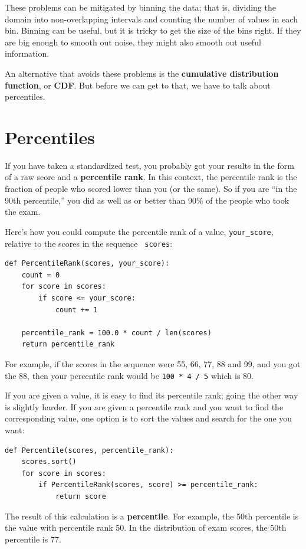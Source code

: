 \documentclass[12pt]{book}
\begin{document}
These problems can be mitigated by binning the data;
that is, dividing the domain into non-overlapping intervals and counting
the number of values in each bin.  Binning can be useful, but it is
tricky to get the size of the bins right.  If they are big enough to
smooth out noise, they might also smooth out useful information.

An alternative that avoids these problems is the {\bf cumulative
distribution function}, or {\bf CDF}.  But before we can get to that,
we have to talk about percentiles.


\section{Percentiles}

If you have taken a standardized test, you probably got your
results in the form of a raw score and a {\bf percentile rank}.
In this context, the percentile rank is the fraction of people who
scored lower than you (or the same).  So if you are ``in the 90th
percentile,'' you did as well as or better than 90\% of the people who
took the exam.

Here's how you could compute the percentile rank of a value,
\verb"your_score", relative to the scores in the sequence {\tt
  scores}:

\begin{verbatim}
def PercentileRank(scores, your_score):
    count = 0
    for score in scores:
        if score <= your_score:
            count += 1

    percentile_rank = 100.0 * count / len(scores)
    return percentile_rank
\end{verbatim}
%
%
For example, if the scores in the sequence were 55, 66, 77, 88 and 99,
and you got the 88, then your percentile rank would be {\tt 100 * 4 / 5}
which is 80.

If you are given a value, it is easy to find its percentile rank; going
the other way is slightly harder.  If you are given a percentile rank
and you want to find the corresponding value, one option is to
sort the values and search for the one you want:

\begin{verbatim}
def Percentile(scores, percentile_rank):
    scores.sort()
    for score in scores:
        if PercentileRank(scores, score) >= percentile_rank:
            return score
\end{verbatim}

The result of this calculation is a {\bf percentile}.  For example,
the 50th percentile is the value with percentile rank 50.  In the
distribution of exam scores, the 50th percentile is 77.
\end{document}
